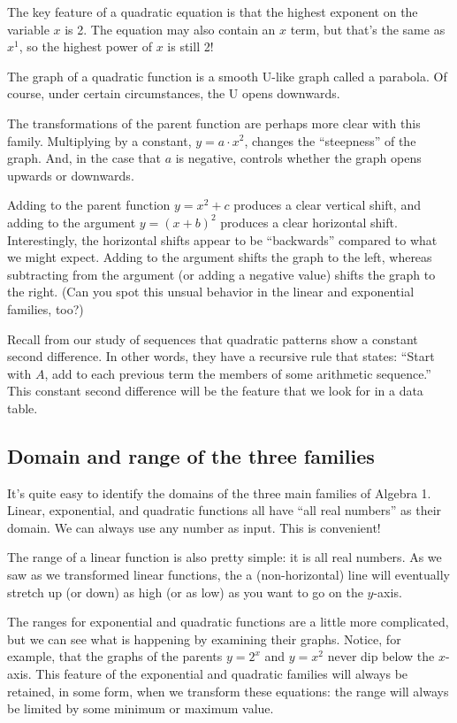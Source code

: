 The key feature of a quadratic equation is that the highest exponent on the variable $x$ is 2. The equation may also contain an $x$ term, but that's the same as $x^1$, so the highest power of $x$ is still 2!

The graph of a quadratic function is a smooth U-like graph called a \gls{parabola}. Of course, under certain circumstances, the U opens downwards.

The transformations of the parent function are perhaps more clear with this family. Multiplying by a constant, $y=a \cdot x^2$, changes the ``steepness'' of the graph. And, in the case that $a$ is negative, controls whether the graph opens upwards or downwards.

Adding to the parent function $y=x^2+c$ produces a clear vertical shift, and adding to the argument $y=(x+b)^2$ produces a clear horizontal shift. Interestingly, the horizontal shifts appear to be ``backwards'' compared to what we might expect. Adding to the argument shifts the graph to the left, whereas subtracting from the argument (or adding a negative value) shifts the graph to the right. (Can you spot this unsual behavior in the linear and exponential families, too?)

Recall from our study of sequences that quadratic patterns show a constant second difference. In other words, they have a recursive rule that states: ``Start with $A$, add to each previous term the members of some arithmetic sequence.'' This constant second difference will be the feature that we look for in a data table.


\subsection{Domain and range of the three families}

It's quite easy to identify the domains of the three main families of Algebra 1. Linear, exponential, and quadratic functions all have ``all real numbers'' as their domain. We can always use any number as input. This is convenient!

The range of a linear function is also pretty simple: it is all real numbers. As we saw as we transformed linear functions, the a (non-horizontal) line will eventually stretch up (or down) as high (or as low) as you want to go on the $y$-axis.

The ranges for exponential and quadratic functions are a little more complicated, but we can see what is happening by examining their graphs. Notice, for example, that the graphs of the parents $y=2^x$ and $y=x^2$ never dip below the $x$-axis. This feature of the exponential and quadratic families will always be retained, in some form, when we transform these equations: the range will always be limited by some minimum or maximum value. 

